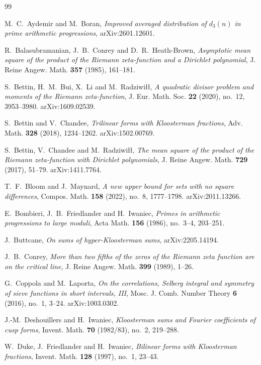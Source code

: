 \documentclass[11pt]{amsart}
\theoremstyle{definition}
\theoremstyle{remark}
\numberwithin{equation}{section}
\begin{document}
\begin{thebibliography}{99}

M.~C.~Aydemir and M.~Boran,
\emph{Improved averaged distribution of $d_3(n)$ in prime arithmetic
progressions},
arXiv:2601.12601.

R.~Balasubramanian, J.~B.~Conrey and D.~R.~Heath-Brown,
\emph{Asymptotic mean square of the product of the Riemann zeta-function and
a Dirichlet polynomial},
J. Reine Angew. Math. \textbf{357} (1985), 161--181.

S.~Bettin, H.~M.~Bui, X.~Li and M.~Radziwi\l\l,
\emph{A quadratic divisor problem and moments of the Riemann zeta-function},
J. Eur. Math. Soc. \textbf{22} (2020), no.~12, 3953--3980.
arXiv:1609.02539.

S.~Bettin and V.~Chandee,
\emph{Trilinear forms with Kloosterman fractions},
Adv. Math. \textbf{328} (2018), 1234--1262.  arXiv:1502.00769.

S.~Bettin, V.~Chandee and M.~Radziwi\l\l,
\emph{The mean square of the product of the Riemann zeta-function with
Dirichlet polynomials},
J. Reine Angew. Math. \textbf{729} (2017), 51--79.  arXiv:1411.7764.

T.~F.~Bloom and J.~Maynard,
\emph{A new upper bound for sets with no square differences},
Compos. Math. \textbf{158} (2022), no.~8, 1777--1798.  arXiv:2011.13266.

E.~Bombieri, J.~B.~Friedlander and H.~Iwaniec,
\emph{Primes in arithmetic progressions to large moduli},
Acta Math. \textbf{156} (1986), no.~3--4, 203--251.

J.~Buttcane,
\emph{On sums of hyper-Kloosterman sums},
arXiv:2205.14194.

J.~B.~Conrey,
\emph{More than two fifths of the zeros of the Riemann zeta function are on
the critical line},
J. Reine Angew. Math. \textbf{399} (1989), 1--26.

G.~Coppola and M.~Laporta,
\emph{On the correlations, Selberg integral and symmetry of sieve functions
in short intervals, III},
Mosc. J. Comb. Number Theory \textbf{6} (2016), no.~1, 3--24.
arXiv:1003.0302.

J.-M.~Deshouillers and H.~Iwaniec,
\emph{Kloosterman sums and Fourier coefficients of cusp forms},
Invent. Math. \textbf{70} (1982/83), no.~2, 219--288.

W.~Duke, J.~Friedlander and H.~Iwaniec,
\emph{Bilinear forms with Kloosterman fractions},
Invent. Math. \textbf{128} (1997), no.~1, 23--43.


\end{thebibliography}
\end{document}

